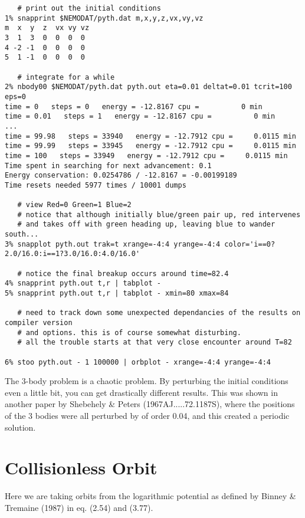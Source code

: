 \begin{itemize}
\begin{itemize}
\footnotesize\begin{verbatim}
   # print out the initial conditions
1% snapprint $NEMODAT/pyth.dat m,x,y,z,vx,vy,vz
m  x  y  z  vx vy vz
3  1  3  0  0  0  0
4 -2 -1  0  0  0  0
5  1 -1  0  0  0  0

   # integrate for a while
2% nbody00 $NEMODAT/pyth.dat pyth.out eta=0.01 deltat=0.01 tcrit=100 eps=0 
time = 0   steps = 0   energy = -12.8167 cpu =          0 min
time = 0.01   steps = 1   energy = -12.8167 cpu =          0 min
...
time = 99.98   steps = 33940   energy = -12.7912 cpu =     0.0115 min
time = 99.99   steps = 33945   energy = -12.7912 cpu =     0.0115 min
time = 100   steps = 33949   energy = -12.7912 cpu =     0.0115 min
Time spent in searching for next advancement: 0.1
Energy conservation: 0.0254786 / -12.8167 = -0.00199189
Time resets needed 5977 times / 10001 dumps

   # view Red=0 Green=1 Blue=2
   # notice that although initially blue/green pair up, red intervenes
   # and takes off with green heading up, leaving blue to wander south...
3% snapplot pyth.out trak=t xrange=-4:4 yrange=-4:4 color='i==0?2.0/16.0:i==1?3.0/16.0:4.0/16.0'

   # notice the final breakup occurs around time=82.4
4% snapprint pyth.out t,r | tabplot -
5% snapprint pyth.out t,r | tabplot - xmin=80 xmax=84

   # need to track down some unexpected dependancies of the results on compiler version
   # and options. this is of course somewhat disturbing.
   # all the trouble starts at that very close encounter around T=82

6% stoo pyth.out - 1 100000 | orbplot - xrange=-4:4 yrange=-4:4 
\end{verbatim}\normalsize

The 3-body problem is a chaotic problem. By perturbing the initial conditions
even a little bit, you can get drastically different results. This was shown
in another paper by Shebehely \& Peters (1967AJ.....72.1187S), where the
positions of the 3 bodies were all perturbed by of order 0.04, and this 
created a periodic solution.


\section{Collisionless Orbit}

Here we are taking orbits from the logarithmic potential as defined
by Binney \& Tremaine (1987) in eq. (2.54) and (3.77).


\end{itemize}
\end{itemize}
